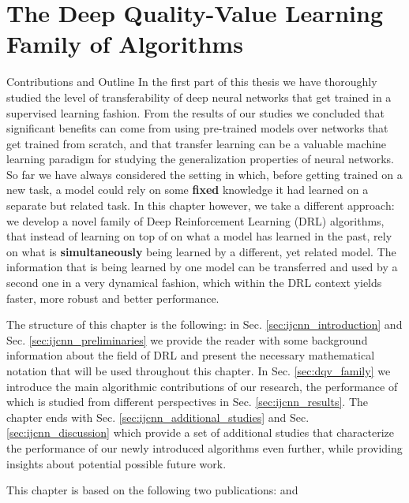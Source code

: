 
\chapter{The Deep Quality-Value Learning Family of Algorithms} %
\label{ch:dqv_family_of_algorithms} %


\begin{remark}{Contributions and Outline}
	In the first part of this thesis we have thoroughly studied the level of transferability of deep neural networks that get trained in a supervised learning fashion. From the results of our studies we concluded that significant benefits can come from using pre-trained models over networks that get trained from scratch, and that transfer learning can be a valuable machine learning paradigm for studying the generalization properties of neural networks. So far we have always considered the setting in which, before getting trained on a new task, a model could rely on some \textbf{fixed} knowledge it had learned on a separate but related task. In this chapter however, we take a different approach: we develop a novel family of Deep Reinforcement Learning (DRL) algorithms, that instead of learning on top of on what a model has learned in the past, rely on what is \textbf{simultaneously} being learned by a different, yet related model. The information that is being learned by one model can be transferred and used by a second one in a very dynamical fashion, which within the DRL context yields faster, more robust and better performance. 

	The structure of this chapter is the following: in Sec. \ref{sec:ijcnn_introduction} and Sec. \ref{sec:ijcnn_preliminaries} we provide the reader with some background information about the field of DRL and present the necessary mathematical notation that will be used throughout this chapter. In Sec. \ref{sec:dqv_family} we introduce the main algorithmic contributions of our research, the performance of which is studied from different perspectives in Sec. \ref{sec:ijcnn_results}. The chapter ends with Sec. \ref{sec:ijcnn_additional_studies} and Sec. \ref{sec:ijcnn_discussion} which provide a set of additional studies that characterize the performance of our newly introduced algorithms even further, while providing insights about potential possible future work. 
\vspace{5mm}

This chapter is based on the following two publications: \citet{sabatelli2018deepqv} and \citet{sabatelli2020deep}
\end{remark}

